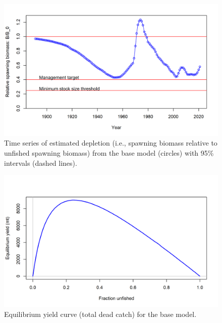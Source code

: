 \documentclass[11pt,
  english,
  a4paper,
]{article}
\begin{document}

\begin{figure}
\centering
\includegraphics[width=1\textwidth,height=0.7\textheight]{figs/ts9_Relative_spawning_biomass.png}
\caption{Time series of estimated depletion (i.e., spawning biomass relative to unfished spawning biomass) from the base model (circles) with 95\% intervals (dashed lines).}
\end{figure}

\tagmcend\tagstructend


\begin{figure}
\centering
\includegraphics[width=1\textwidth,height=1\textheight]{figs/yield1_yield_curve.png}
\caption{Equilibrium yield curve (total dead catch) for the base model.}
\end{figure}
\end{document}
